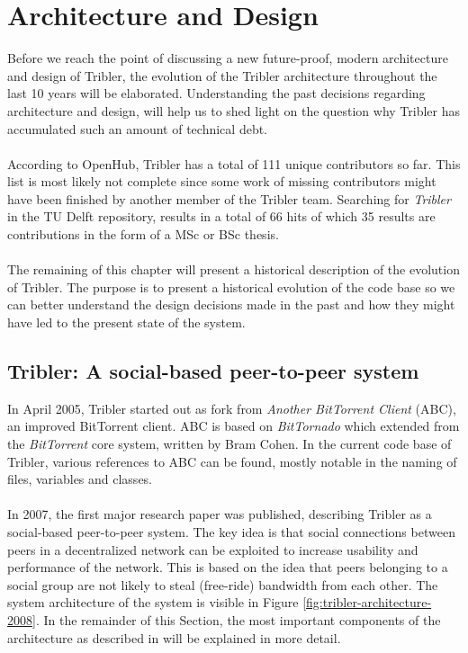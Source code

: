 \chapter{Architecture and Design}
\label{chapter:architecture}

Before we reach the point of discussing a new future-proof, modern architecture and design of Tribler, the evolution of the Tribler architecture  throughout the last 10 years will be elaborated. Understanding the past decisions regarding architecture and design, will help us to shed light on the question why Tribler has accumulated such an amount of technical debt.\\\\
According to OpenHub, Tribler has a total of 111 unique contributors so far\cite{openhubtribler}. This list is most likely not complete since some work of missing contributors might have been finished by another member of the Tribler team. Searching for \emph{Tribler} in the TU Delft repository, results in a total of 66 hits of which 35 results are contributions in the form of a MSc or BSc thesis.\\\\
The remaining of this chapter will present a historical description of the evolution of Tribler. The purpose is to present a historical evolution of the code base so we can better understand the design decisions made in the past and how they might have led to the present state of the system.

\section{Tribler: A social-based peer-to-peer system}
In April 2005, Tribler started out as fork from \emph{Another BitTorrent Client} (ABC), an improved BitTorrent client. ABC is based on \emph{BitTornado} which extended from the \emph{BitTorrent} core system, written by Bram Cohen. In the current code base of Tribler, various references to ABC can be found, mostly notable in the naming of files, variables and classes.\\\\
In 2007, the first major research paper was published, describing Tribler as a social-based peer-to-peer system\cite{pouwelse2008tribler}. The key idea is that social connections between peers in a decentralized network can be exploited to increase usability and performance of the network. This is based on the idea that peers belonging to a social group are not likely to steal (free-ride) bandwidth from each other. The system architecture of the system is visible in Figure \ref{fig:tribler-architecture-2008}. In the remainder of this Section, the most important components of the architecture as described in \cite{pouwelse2008tribler} will be explained in more detail.

